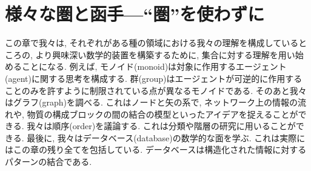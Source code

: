 

\chapter{様々な圏と函手---“圏”を使わずに}\label{chap:categories and functors without admitting it}


この章で我々は, それぞれがある種の領域における我々の理解を構成しているところの, より興味深い数学的装置を構築するために, 集合に対する理解を用い始めることになる. 例えば, モノイド(monoid)は対象に作用するエージェント(agent)に関する思考を構成する. 群(group)はエージェントが可逆的に作用することのみを許すように制限されている点が異なるモノイドである. そのあと我々はグラフ(graph)を調べる. これはノードと矢の系で, ネットワーク上の情報の流れや, 物質の構成ブロックの間の結合の模型といったアイデアを捉えることができる. 我々は順序(order)を議論する. これは分類や階層の研究に用いることができる. 最後に, 我々はデータベース(database)の数学的な面を学ぶ. これは実際にはこの章の残り全てを包括している. データベースは構造化された情報に対するパターンの結合である.


